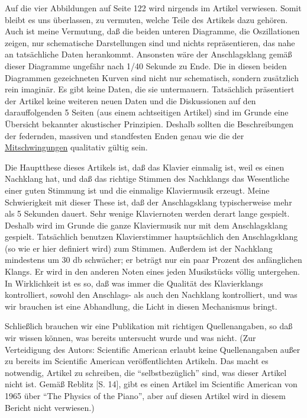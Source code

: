 Auf die vier Abbildungen auf Seite 122 wird nirgends im Artikel verwiesen.
Somit bleibt es uns überlassen, zu vermuten, welche Teile des Artikels dazu gehören.
Auch ist meine Vermutung, daß die beiden unteren Diagramme, die Oszillationen zeigen, nur schematische Darstellungen sind und nichts repräsentieren, das nahe an tatsächliche Daten herankommt.
Ansonsten wäre der Anschlagsklang gemäß dieser Diagramme ungefähr nach 1/40 Sekunde zu Ende.
Die in diesen beiden Diagrammen gezeichneten Kurven sind nicht nur schematisch, sondern zusätzlich rein imaginär.
Es gibt keine Daten, die sie untermauern.
Tatsächlich präsentiert der Artikel keine weiteren neuen Daten und die Diskussionen auf den darauffolgenden 5 Seiten (aus einem achtseitigen Artikel) sind im Grunde eine Übersicht bekannter akustischer Prinzipien.
Deshalb sollten die Beschreibungen der federnden, massiven und standfesten Enden genau wie die der \hyperref[mitschwingung]{Mitschwingungen} qualitativ gültig sein.

Die Hauptthese dieses Artikels ist, daß das Klavier einmalig ist, weil es einen Nachklang hat, und daß das richtige Stimmen des Nachklangs das Wesentliche einer guten Stimmung ist und die einmalige Klaviermusik erzeugt.
Meine Schwierigkeit mit dieser These ist, daß der Anschlagsklang typischerweise mehr als 5 Sekunden dauert.
Sehr wenige Klaviernoten werden derart lange gespielt.
Deshalb wird im Grunde die ganze Klaviermusik nur mit dem Anschlagsklang gespielt.
Tatsächlich benutzen Klavierstimmer hauptsächlich den Anschlagsklang (so wie er hier definiert wird) zum Stimmen.
Außerdem ist der Nachklang mindestens um 30 db schwächer; er beträgt nur ein paar Prozent des anfänglichen Klangs.
Er wird in den anderen Noten eines jeden Musikstücks völlig untergehen.
In Wirklichkeit ist es so, daß was immer die Qualität des Klavierklangs kontrolliert, sowohl den Anschlags- als auch den Nachklang kontrolliert, und was wir brauchen ist eine Abhandlung, die Licht in diesen Mechanismus bringt.

Schließlich brauchen wir eine Publikation mit richtigen Quellenangaben, so daß wir wissen können, was bereits untersucht wurde und was nicht.
(Zur Verteidigung des Autors: Scientific American erlaubt keine Quellenangaben außer zu bereits im Scientific American veröffentlichten Artikeln.
Das macht es notwendig, Artikel zu schreiben, die \enquote{selbstbezüglich} sind, was dieser Artikel nicht ist.
Gemäß Reblitz [S. 14], gibt es einen Artikel im Scientific American von 1965 über \enquote{The Physics of the Piano}, aber auf diesen Artikel wird in diesem Bericht nicht verwiesen.)


